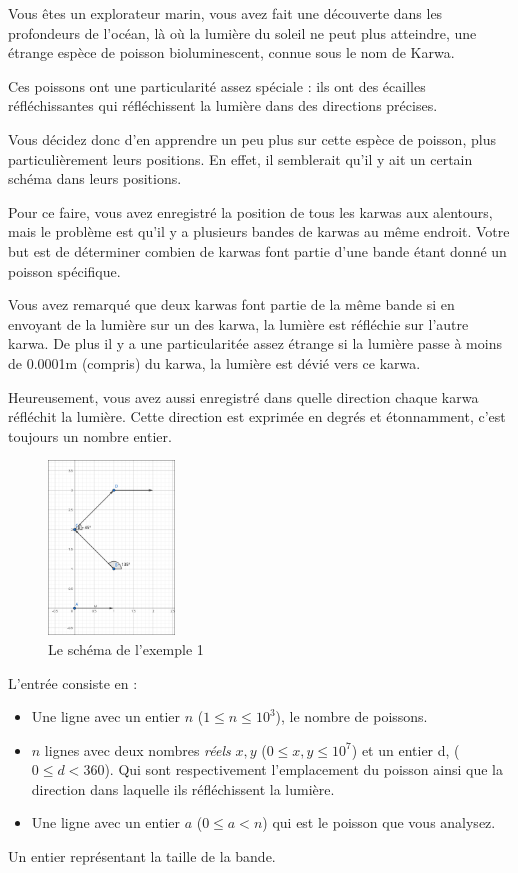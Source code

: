 \problemname{}


Vous êtes un explorateur marin, vous avez fait une découverte dans les profondeurs de l'océan, là où la lumière du soleil ne peut plus atteindre, une étrange espèce de poisson bioluminescent, connue sous le nom de Karwa.

Ces poissons ont une particularité assez spéciale : ils ont des écailles réfléchissantes qui réfléchissent la lumière dans des directions précises.

Vous décidez donc d'en apprendre un peu plus sur cette espèce de poisson, plus particulièrement leurs positions. En effet, il semblerait qu'il y ait un certain schéma dans leurs positions.

Pour ce faire, vous avez enregistré la position de tous les karwas aux alentours, mais le problème est qu'il y a plusieurs bandes de karwas au même endroit. Votre but est de déterminer combien de karwas font partie d'une bande étant donné un poisson spécifique.

Vous avez remarqué que deux karwas font partie de la même bande si en envoyant de la lumière sur un des karwa, la lumière est réfléchie sur l'autre karwa. De plus il y a une particularitée assez étrange si la lumière passe à moins de 0.0001m (compris) du karwa, la lumière est dévié vers ce karwa.

Heureusement, vous avez aussi enregistré dans quelle direction chaque karwa réfléchit la lumière. Cette direction est exprimée en degrés et étonnamment, c'est toujours un nombre entier.


\smallskip
\begin{figure}[h]
    \centering
    \includegraphics[width=0.3\textwidth]{sample1.png}
    \caption{Le schéma de l'exemple 1}
\end{figure}

\begin{Input}
    L'entrée consiste en :
    \begin{itemize}
        \item Une ligne avec un entier $n$ ($1 \leq n \leq 10^{3}$), le nombre de poissons.
        \item $n$ lignes avec deux nombres \emph{réels} $x, y$ ($0 \leq x,y \leq {10^{7}}$) et un entier d, ($0 \leq d < 360$). Qui sont respectivement l'emplacement du poisson ainsi que la direction dans laquelle ils réfléchissent la lumière.
        \item Une ligne avec un entier $a$ ($0 \leq a < n$) qui est le poisson que vous analysez.
    \end{itemize}
\end{Input}

\begin{Output}
    Un entier représentant la taille de la bande.
\end{Output}
